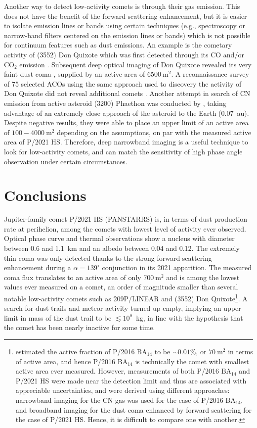\documentclass[modern]{aastex631}
\begin{document}
\begin{CJK*}{UTF8}{gbsn}
Another way to detect low-activity comets is through their gas emission. This does not have the benefit of the forward scattering enhancement, but it is easier to isolate emission lines or bands using certain techniques (e.g., spectroscopy or narrow-band filters centered on the emission lines or bands) which is not possible for continuum features such as dust emissions. An example is the cometary activity of (3552) Don Quixote which was first detected through its CO and/or CO$_2$ emission \citep{Mommert2014}. Subsequent deep optical imaging of Don Quixote revealed its very faint dust coma \citep{Mommert2020b}, supplied by an active area of $6500~\mathrm{m^2}$. A reconnaissance survey of 75 selected ACOs using the same approach used to discovery the activity of Don Quixote did not reveal additional comets \citep{Mommert2020}. Another attempt in search of CN emission from active asteroid (3200) Phaethon was conducted by \citet{Ye2021}, taking advantage of an extremely close approach of the asteroid to the Earth (0.07~au). Despite negative results, they were able to place an upper limit of an active area of $100-4000~\mathrm{m^2}$ depending on the assumptions, on par with the measured active area of P/2021 HS. Therefore, deep narrowband imaging is a useful technique to look for low-activity comets, and can match the sensitivity of high phase angle observation under certain circumstances.

\section{Conclusions}

Jupiter-family comet P/2021 HS (PANSTARRS) is, in terms of dust production rate at perihelion, among the comets with lowest level of activity ever observed. Optical phase curve and thermal observations show a nucleus with diameter between 0.6 and 1.1~km and an albedo between 0.04 and 0.12. The extremely thin coma was only detected thanks to the strong forward scattering enhancement during a $\alpha=139^\circ$ conjunction in its 2021 apparition. The measured coma flux translates to an active area of only $700~\mathrm{m^2}$ and is among the lowest values ever measured on a comet, an order of magnitude smaller than several notable low-activity comets such as 209P/LINEAR and (3552) Don Quixote\footnote{\citet{Li2017} estimated the active fraction of P/2016 BA$_{14}$ to be $\sim0.01\%$, or $70~\mathrm{m^2}$ in terms of active area, and hence P/2016 BA$_{14}$ is technically the comet with smallest active area ever measured. However, measurements of both P/2016 BA$_{14}$ and P/2021 HS were made near the detection limit and thus are associated with appreciable uncertainties, and were derived using different approaches: narrowband imaging for the CN gas was used for the case of P/2016 BA$_{14}$, and broadband imaging for the dust coma enhanced by forward scattering for the case of P/2021 HS. Hence, it is difficult to compare one with another.}. A search for dust trails and meteor activity turned up empty, implying an upper limit in mass of the dust trail to be $\lesssim10^8$~kg, in line with the hypothesis that the comet has been nearly inactive for some time.


\end{CJK*}
\end{document}
